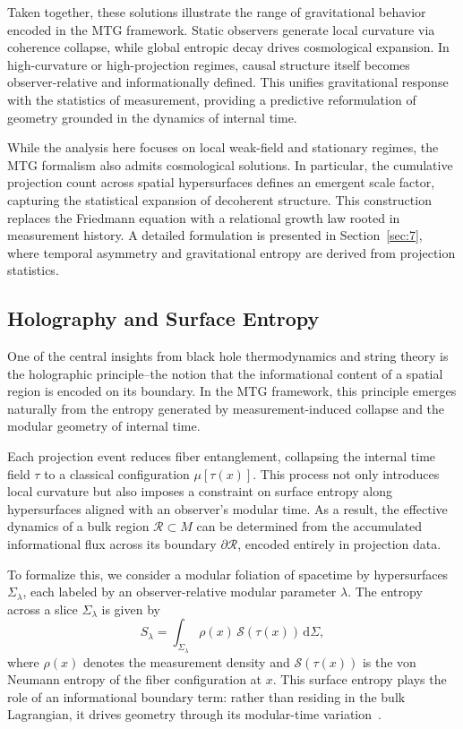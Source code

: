 \documentclass[11pt]{article}
\begin{document}
Taken together, these solutions illustrate the range of gravitational behavior encoded in the MTG framework. Static observers generate local curvature via coherence collapse, while global entropic decay drives cosmological expansion. In high-curvature or high-projection regimes, causal structure itself becomes observer-relative and informationally defined. This unifies gravitational response with the statistics of measurement, providing a predictive reformulation of geometry grounded in the dynamics of internal time.

While the analysis here focuses on local weak-field and stationary regimes, the MTG formalism also admits cosmological solutions. In particular, the cumulative projection count across spatial hypersurfaces defines an emergent scale factor, capturing the statistical expansion of decoherent structure. This construction replaces the Friedmann equation with a relational growth law rooted in measurement history. A detailed formulation is presented in Section~\ref{sec:7}, where temporal asymmetry and gravitational entropy are derived from projection statistics.
\subsection{Holography and Surface Entropy}

One of the central insights from black hole thermodynamics and string theory is the holographic principle--the notion that the informational content of a spatial region is encoded on its boundary. In the MTG framework, this principle emerges naturally from the entropy generated by measurement-induced collapse and the modular geometry of internal time.

Each projection event reduces fiber entanglement, collapsing the internal time field \( \tau \) to a classical configuration \( \mu[\tau(x)] \). This process not only introduces local curvature but also imposes a constraint on surface entropy along hypersurfaces aligned with an observer’s modular time. As a result, the effective dynamics of a bulk region \( \mathcal{R} \subset M \) can be determined from the accumulated informational flux across its boundary \( \partial \mathcal{R} \), encoded entirely in projection data.

To formalize this, we consider a modular foliation of spacetime by hypersurfaces \( \Sigma_\lambda \), each labeled by an observer-relative modular parameter \( \lambda \). The entropy across a slice \( \Sigma_\lambda \) is given by
\begin{equation}
S_\lambda = \int_{\Sigma_\lambda} \rho(x) \, \mathcal{S}(\tau(x)) \, \mathrm{d}\Sigma,
\end{equation}
where \( \rho(x) \) denotes the measurement density and \( \mathcal{S}(\tau(x)) \) is the von Neumann entropy of the fiber configuration at \( x \). This surface entropy plays the role of an informational boundary term: rather than residing in the bulk Lagrangian, it drives geometry through its modular-time variation~\cite{takayanagi2025holographic}.
\end{document}

